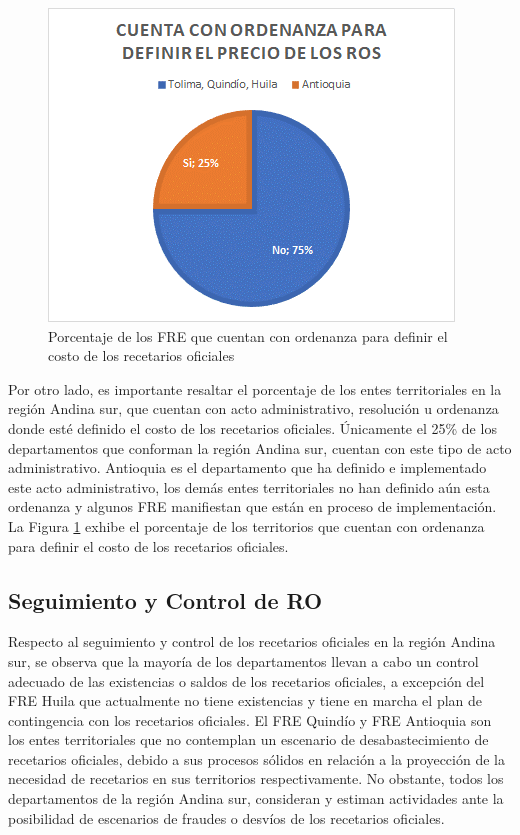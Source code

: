 \documentclass[
]{book}
\begin{document}
\begin{figure}

{\centering \includegraphics[width=0.5\linewidth]{figures/Imagen14} 

}

\caption{Porcentaje de los FRE que cuentan con ordenanza para definir el costo de los recetarios oficiales}\label{fig:OrdenanzasRegionAndinaSur}
\end{figure}

Por otro lado, es importante resaltar el porcentaje de los entes territoriales en la región Andina sur, que cuentan con acto administrativo, resolución u ordenanza donde esté definido el costo de los recetarios oficiales. Únicamente el 25\% de los departamentos que conforman la región Andina sur, cuentan con este tipo de acto administrativo. Antioquia es el departamento que ha definido e implementado este acto administrativo, los demás entes territoriales no han definido aún esta ordenanza y algunos FRE manifiestan que están en proceso de implementación. La Figura \ref{fig:OrdenanzasRegionAndinaSur} exhibe el porcentaje de los territorios que cuentan con ordenanza para definir el costo de los recetarios oficiales.

\hypertarget{seguimiento-y-control-de-ro-1}{%
\subsection{Seguimiento y Control de RO}\label{seguimiento-y-control-de-ro-1}}

Respecto al seguimiento y control de los recetarios oficiales en la región Andina sur, se observa que la mayoría de los departamentos llevan a cabo un control adecuado de las existencias o saldos de los recetarios oficiales, a excepción del FRE Huila que actualmente no tiene existencias y tiene en marcha el plan de contingencia con los recetarios oficiales. El FRE Quindío y FRE Antioquia son los entes territoriales que no contemplan un escenario de desabastecimiento de recetarios oficiales, debido a sus procesos sólidos en relación a la proyección de la necesidad de recetarios en sus territorios respectivamente. No obstante, todos los departamentos de la región Andina sur, consideran y estiman actividades ante la posibilidad de escenarios de fraudes o desvíos de los recetarios oficiales.
\end{document}
